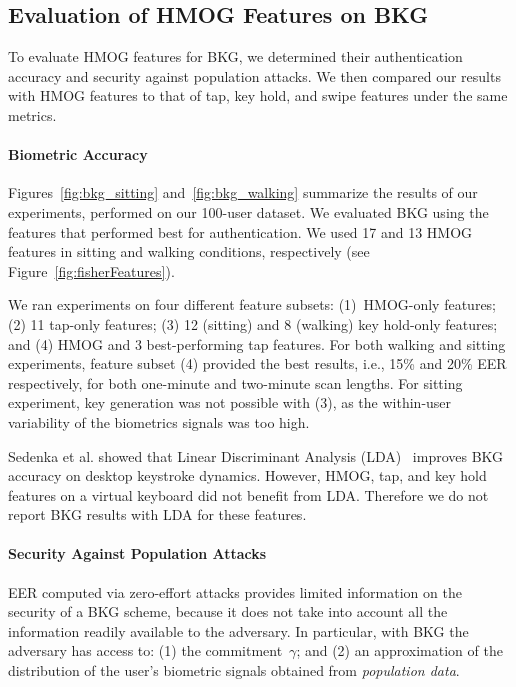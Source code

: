 \subsection{Evaluation of HMOG Features on BKG}

To evaluate HMOG features for BKG, we determined their authentication 
accuracy and security against population attacks. We then compared our results with HMOG features to that of tap, key hold, and swipe features under the same metrics.
%

\paragraph{Biometric Accuracy}
Figures~\ref{fig:bkg_sitting} and~\ref{fig:bkg_walking} summarize the results of 
our experiments, performed on our 100-user dataset. We evaluated BKG using the 
features that performed best for authentication. We used 17 and 13 HMOG features in sitting and walking conditions, respectively (see Figure~\ref{fig:fisherFeatures}).


We ran experiments on four different feature subsets: (1)~HMOG-only features; 
(2) 11 tap-only features; (3) 12 (sitting) and 8 (walking) key hold-only features; 
and (4) HMOG and 3 best-performing tap features. For both walking and sitting experiments, feature 
subset (4) provided the best results, i.e., 15\% and 20\% EER respectively, for both one-minute and two-minute scan lengths. For sitting 
experiment, key generation was not possible with (3), as the within-user 
variability of the biometrics signals was too high. 

Sedenka et al.\cite{sedenka2014} showed that Linear Discriminant Analysis (LDA)~\cite{lda} 
improves BKG accuracy on desktop keystroke dynamics. However, HMOG, tap, and 
key hold features on a virtual keyboard did not benefit from LDA. Therefore we do 
not report BKG results with LDA for these features.


\paragraph{Security Against Population Attacks}
EER computed via zero-effort attacks provides limited information on the security 
of a BKG scheme, because it does not take into account all the information 
readily available to the adversary. In particular, with BKG the adversary has 
access to: (1) the commitment~$\gamma$; and (2) an approximation of the 
distribution of the user's biometric signals obtained from  {\em population 
data}. 

